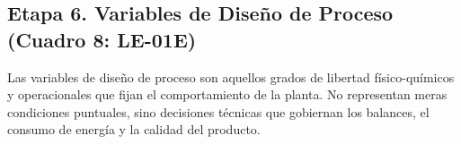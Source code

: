 \documentclass[10pt,letterpaper]{article}
\begin{document}
\newpage
\begin{landscape}
\section{Etapa 6. Variables de Diseño de Proceso (Cuadro 8: LE-01E)}

Las variables de diseño de proceso son aquellos grados de libertad físico-químicos y operacionales que fijan el comportamiento de la planta. No representan meras condiciones puntuales, sino decisiones técnicas que gobiernan los balances, el consumo de energía y la calidad del producto.


\end{landscape}
\end{document}
